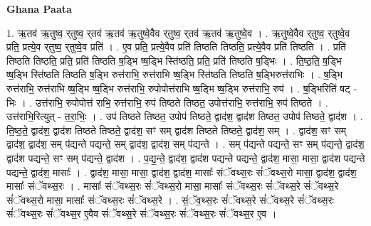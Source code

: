 \documentclass[17pt]{extarticle}
\begin{document}
\textbf{Ghana Paata } \newline

1. ऋ॒तव॑ ऋ॒तुष्व॒ र्‌तुष्व॒ र्‌तव॑ ऋ॒तव॑ ऋ॒तुष्वे॒वैव र्‌तुष्व॒ र्‌तव॑ ऋ॒तव॑ ऋ॒तुष्वे॒व । . ऋ॒तुष्वे॒वैव र्‌तुष्व॒ र्‌तुष्वे॒व प्रति॒ प्रत्ये॒व र्‌तुष्व॒ र्‌तुष्वे॒व प्रति॑ । . ए॒व प्रति॒ प्रत्ये॒वैव प्रति॑ तिष्ठति तिष्ठति॒ प्रत्ये॒वैव प्रति॑ तिष्ठति । . प्रति॑ तिष्ठति तिष्ठति॒ प्रति॒ प्रति॑ तिष्ठति ष॒ड्भि ष्ष॒ड्भि स्ति॑ष्ठति॒ प्रति॒ प्रति॑ तिष्ठति ष॒ड्भिः । . ति॒ष्ठ॒ति॒ ष॒ड्भि ष्ष॒ड्भि स्ति॑ष्ठति तिष्ठति ष॒ड्भि रुत्त॑राभि॒ रुत्त॑राभि ष्ष॒ड्भि स्ति॑ष्ठति तिष्ठति ष॒ड्भिरुत्त॑राभिः । . ष॒ड्भि रुत्त॑राभि॒ रुत्त॑राभि ष्ष॒ड्भि ष्ष॒ड्भि रुत्त॑राभि॒ रुपोपोत्त॑राभि ष्ष॒ड्भि ष्ष॒ड्भि रुत्त॑राभि॒ रुप॑ । . ष॒ड्भिरिति॑ षट् - भिः । . उत्त॑राभि॒ रुपोपोत्त॑ राभि॒ रुत्त॑राभि॒ रुप॑ तिष्ठते तिष्ठत॒ उपोत्त॑राभि॒ रुत्त॑राभि॒ रुप॑ तिष्ठते । . उत्त॑राभि॒रित्युत् - त॒रा॒भिः॒ । . उप॑ तिष्ठते तिष्ठत॒ उपोप॑ तिष्ठते॒ द्वाद॑श॒ द्वाद॑श तिष्ठत॒ उपोप॑ तिष्ठते॒ द्वाद॑श । . ति॒ष्ठ॒ते॒ द्वाद॑श॒ द्वाद॑श तिष्ठते तिष्ठते॒ द्वाद॑श॒ सꣳ सम् द्वाद॑श तिष्ठते तिष्ठते॒ द्वाद॑श॒ सम् । . द्वाद॑श॒ सꣳ सम् द्वाद॑श॒ द्वाद॑श॒ सम् प॑द्यन्ते पद्यन्ते॒ सम् द्वाद॑श॒ द्वाद॑श॒ सम् प॑द्यन्ते । . सम् प॑द्यन्ते पद्यन्ते॒ सꣳ सम् प॑द्यन्ते॒ द्वाद॑श॒ द्वाद॑श पद्यन्ते॒ सꣳ सम् प॑द्यन्ते॒ द्वाद॑श । . प॒द्य॒न्ते॒ द्वाद॑श॒ द्वाद॑श पद्यन्ते पद्यन्ते॒ द्वाद॑श॒ मासा॒ मासा॒ द्वाद॑श पद्यन्ते पद्यन्ते॒ द्वाद॑श॒ मासाः᳚ । . द्वाद॑श॒ मासा॒ मासा॒ द्वाद॑श॒ द्वाद॑श॒ मासाः᳚ संॅवथ्स॒रः सं॑ॅवथ्स॒रो मासा॒ द्वाद॑श॒ द्वाद॑श॒ मासाः᳚ संॅवथ्स॒रः । . मासाः᳚ संॅवथ्स॒रः सं॑ॅवथ्स॒रो मासा॒ मासाः᳚ संॅवथ्स॒रः सं॑ॅवथ्स॒रे सं॑ॅवथ्स॒रे सं॑ॅवथ्स॒रो मासा॒ मासाः᳚ संॅवथ्स॒रः सं॑ॅवथ्स॒रे । . सं॒ॅव॒थ्स॒रः सं॑ॅवथ्स॒रे सं॑ॅवथ्स॒रे सं॑ॅवथ्स॒रः सं॑ॅवथ्स॒रः सं॑ॅवथ्स॒र ए॒वैव सं॑ॅवथ्स॒रे सं॑ॅवथ्स॒रः सं॑ॅवथ्स॒रः सं॑ॅवथ्स॒र ए॒व । \newline
\end{document}
